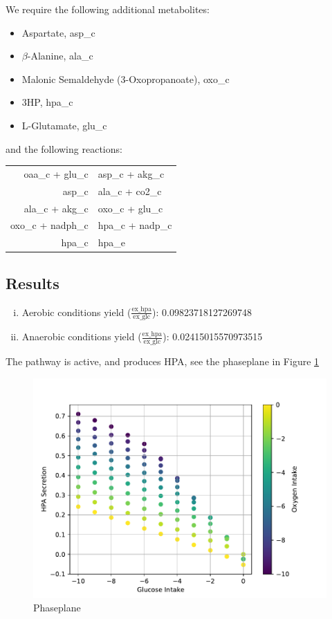 \documentclass{scrartcl}
\begin{document}
	We require the following additional metabolites:
	\begin{itemize}
		\item Aspartate, asp\_c
		\item $\beta$-Alanine, ala\_c
		\item Malonic Semaldehyde (3-Oxopropanoate), oxo\_c
		\item 3HP, hpa\_c
		\item L-Glutamate, glu\_c
	\end{itemize}
	and the following reactions:
	\begin{center}
	\begin{tabular}{r@{$\;\rightarrow\;$}l}
		oaa\_c + glu\_c & asp\_c + akg\_c \\
		asp\_c & ala\_c + co2\_c\\
		ala\_c + akg\_c & oxo\_c + glu\_c\\
		oxo\_c + nadph\_c & hpa\_c + nadp\_c\\
		hpa\_c & hpa\_e
	\end{tabular}
	\end{center}
	\subsection{Results}
		\begin{enumerate}[i)]
			\item Aerobic conditions yield ($\mathrm{\frac{ex\_hpa}{ex\_glc}}$): 0.09823718127269748
			\item Anaerobic conditions yield ($\mathrm{\frac{ex\_hpa}{ex\_glc}}$): 0.02415015570973515

		\end{enumerate}
		The pathway is active, and produces HPA, see the phaseplane in Figure \ref{fig:phaseplane}
		\begin{figure}[h]
			\centering
			\includegraphics[max width=0.75\linewidth]{src/phaseplane.pdf}
			\caption{Phaseplane}
			\label{fig:phaseplane}
		\end{figure}
\end{document}

